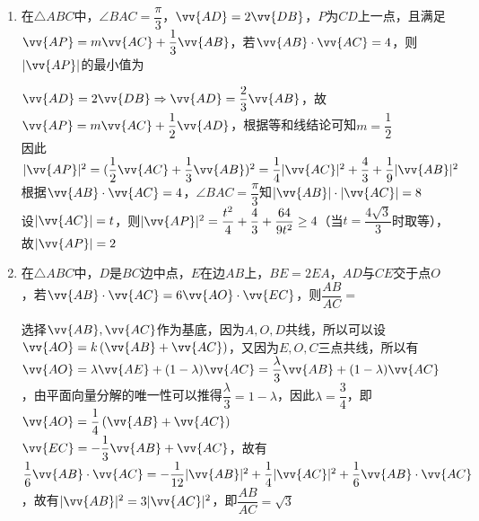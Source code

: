 \begin{enumerate}
\begin{enumerate}
        \item 在$\triangle ABC$中，$\angle BAC = \dfrac{\pi}{3}$，$\vv{AD} = 2\vv{DB}$，$P$为$CD$上一点，且满足$\vv{AP} = m\vv{AC} + \dfrac{1}{3}\vv{AB}$，若$\vv{AB} \cdot \vv{AC} = 4$，则$|\vv{AP}|$的最小值为
        \begin{jieda}
            $\vv{AD} = 2\vv{DB} \Rightarrow \vv{AD} = \dfrac{2}{3}\vv{AB}$，故$\vv{AP} = m \vv{AC} + \dfrac{1}{2}\vv{AD}$，根据等和线结论可知$m = \dfrac{1}{2}$ \\
            因此$|\vv{AP}|^2 = (\dfrac{1}{2}\vv{AC} + \dfrac{1}{3}\vv{AB})^2 = \dfrac{1}{4}|\vv{AC}|^2 + \dfrac{4}{3} + \dfrac{1}{9}|\vv{AB}|^2$\\
            根据$\vv{AB} \cdot \vv{AC} = 4$，$\angle BAC = \dfrac{\pi}{3}$知$|\vv{AB}| \cdot |\vv{AC}| = 8$ \\
            设$|\vv{AC}| = t$，则$|\vv{AP}|^2 = \dfrac{t^2}{4} + \dfrac{4}{3} + \dfrac{64}{9t^2} \geq 4$（当$t = \dfrac{4\sqrt{3}}{3}$时取等），故$|\vv{AP}| = 2$
        \end{jieda}
        \item 在$\triangle ABC$中，$D$是$BC$边中点，$E$在边$AB$上，$BE = 2EA$，$AD$与$CE$交于点$O$，若$\vv{AB} \cdot \vv{AC} = 6\vv{AO} \cdot \vv{EC}$，则$\dfrac{AB}{AC} = $
        \begin{jieda}
            选择$\vv{AB}, \vv{AC}$作为基底，因为$A,O,D$共线，所以可以设$\vv{AO} = k\left(\vv{AB} + \vv{AC}\right)$，又因为$E,O,C$三点共线，所以有$\vv{AO} = \lambda \vv{AE} + (1-\lambda) \vv{AC} = \dfrac{\lambda}{3} \vv{AB} + (1-\lambda) \vv{AC}$，由平面向量分解的唯一性可以推得$\dfrac{\lambda}{3} = 1-\lambda$，因此$\lambda = \dfrac{3}{4}$，即$\vv{AO} = \dfrac{1}{4}\left(\vv{AB} + \vv{AC}\right)$\\
            $\vv{EC} = -\dfrac{1}{3}\vv{AB} + \vv{AC}$，故有$\dfrac{1}{6}\vv{AB} \cdot \vv{AC} = -\dfrac{1}{12}|\vv{AB}|^2 + \dfrac{1}{4} |\vv{AC}|^2 + \dfrac{1}{6}\vv{AB} \cdot \vv{AC}$，故有$|\vv{AB}|^2 = 3|\vv{AC}|^2$，即$\dfrac{AB}{AC} = \sqrt{3}$
        \end{jieda}


\end{enumerate}
\end{enumerate}
